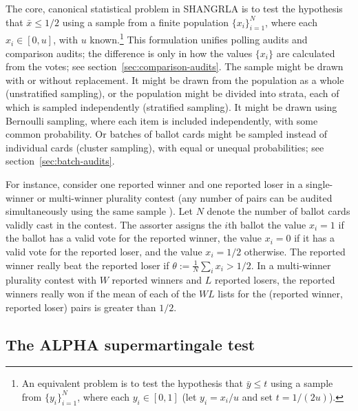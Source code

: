 \documentclass[aoas]{imsart}
\begin{document}
The core, canonical statistical problem in SHANGRLA is to test the hypothesis that $\bar{x} \le 1/2$ using a 
sample from a finite population $\{x_i\}_{i=1}^N$, 
where each $x_i \in [0, u]$, with $u$ known.\footnote{%
An equivalent problem is to test the hypothesis that 
$\bar{y} \le t$ using a sample from $\{y_i\}_{i=1}^N$, where each $y_i \in [0, 1]$ (let $y_i = x_i/u$ and set $t=1/(2u)$).
}
This formulation unifies polling audits and comparison audits; the difference is only in how the 
values $\{x_i\}$ are calculated from the votes; see section~\ref{sec:comparison-audits}.
The sample might be drawn with or without replacement.
It might be drawn from the population as a whole 
(unstratified sampling), or the population might be divided into strata, each of which is sampled independently (stratified sampling).
It might be drawn using Bernoulli sampling, where each item is included independently, with some common probability.
Or batches of ballot cards might be sampled instead of individual cards (cluster sampling),
with equal or unequal probabilities; see section~\ref{sec:batch-audits}.

For instance, consider one reported winner and one reported loser in a single-winner or multi-winner plurality 
contest (any number of pairs can
be audited simultaneously using the same sample \citep{stark20}).
Let $N$ denote the number of ballot cards validly cast in the contest.
The assorter assigns the $i$th ballot the value $x_i=1$ if the ballot has a valid vote for the reported winner, 
the value $x_i=0$ if it has a valid vote for the reported loser, and the value $x_i=1/2$ otherwise.
The reported winner really beat the reported loser if $\theta := \frac{1}{N}\sum_i x_i > 1/2$.
In a multi-winner plurality contest with $W$ reported winners and $L$ reported losers,
the reported winners really won if the mean of each of the $WL$ lists for the (reported winner, reported loser) pairs
is greater than $1/2$.

\subsection{The ALPHA supermartingale test}
\end{document}
